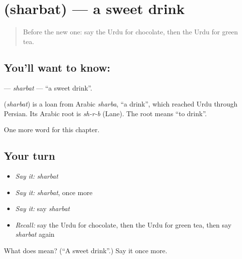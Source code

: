 \section[\texorpdfstring{\ur{شربت} (sharbat)}{شربت (sharbat)}]{ (sharbat) — a sweet drink}

\label{lesson:UR-C118-sharbat}



\begin{quote}
Before the new one: say the Urdu for chocolate, then the Urdu for green tea.
\end{quote}

\subsection*{You'll want to know: }
\textbf{} — \emph{sharbat} — \textquotedblleft{}a sweet drink\textquotedblright{}.

\begin{cousinweb}
\textbf{} (\emph{sharbat}) is a loan from Arabic \emph{sharba}, \textquotedblleft{}a drink\textquotedblright{}, which reached Urdu through Persian. Its Arabic root is \emph{sh-r-b} (Lane). The root means \textquotedblleft{}to drink\textquotedblright{}.
\end{cousinweb}

\begin{grammarlens}[title={What you've built}]
One more word for this chapter.
\end{grammarlens}

\subsection*{Your turn}
\begin{itemize}
\raggedright
  \item \emph{Say it:} \emph{sharbat}
  \item \emph{Say it:} \emph{sharbat}, once more
  \item \emph{Say it:} say \emph{sharbat}
  \item \emph{Recall:} say the Urdu for chocolate, then the Urdu for green tea, then say \emph{sharbat} again
\end{itemize}

\begin{tcolorbox}[breakable,colback=teal!4,colframe=teal!35!black,title={Before you move on}]
What does  mean? (\textquotedblleft{}A sweet drink\textquotedblright{}.) Say it once more.
\end{tcolorbox}
